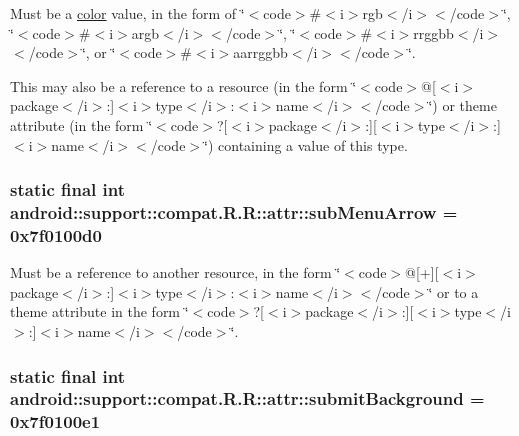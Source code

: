 Must be a \hyperlink{classandroid_1_1support_1_1compat_1_1_r_1_1color}{color} value, in the form of \char`\"{}$<$code$>$\#$<$i$>$rgb$<$/i$>$$<$/code$>$\char`\"{}, \char`\"{}$<$code$>$\#$<$i$>$argb$<$/i$>$$<$/code$>$\char`\"{}, \char`\"{}$<$code$>$\#$<$i$>$rrggbb$<$/i$>$$<$/code$>$\char`\"{}, or \char`\"{}$<$code$>$\#$<$i$>$aarrggbb$<$/i$>$$<$/code$>$\char`\"{}. 

This may also be a reference to a resource (in the form \char`\"{}$<$code$>$@\mbox{[}$<$i$>$package$<$/i$>$:\mbox{]}$<$i$>$type$<$/i$>$:$<$i$>$name$<$/i$>$$<$/code$>$\char`\"{}) or theme attribute (in the form \char`\"{}$<$code$>$?\mbox{[}$<$i$>$package$<$/i$>$:\mbox{]}\mbox{[}$<$i$>$type$<$/i$>$:\mbox{]}$<$i$>$name$<$/i$>$$<$/code$>$\char`\"{}) containing a value of this type. \hypertarget{classandroid_1_1support_1_1compat_1_1_r_1_1attr_ba8eed4cb75c9f5bf93cb1286f7bbc19}{
\subsubsection[{subMenuArrow}]{\setlength{\rightskip}{0pt plus 5cm}static final int android::support::compat.R.R::attr::subMenuArrow = 0x7f0100d0}}
\label{classandroid_1_1support_1_1compat_1_1_r_1_1attr_ba8eed4cb75c9f5bf93cb1286f7bbc19}


Must be a reference to another resource, in the form \char`\"{}$<$code$>$@\mbox{[}+\mbox{]}\mbox{[}$<$i$>$package$<$/i$>$:\mbox{]}$<$i$>$type$<$/i$>$:$<$i$>$name$<$/i$>$$<$/code$>$\char`\"{} or to a theme attribute in the form \char`\"{}$<$code$>$?\mbox{[}$<$i$>$package$<$/i$>$:\mbox{]}\mbox{[}$<$i$>$type$<$/i$>$:\mbox{]}$<$i$>$name$<$/i$>$$<$/code$>$\char`\"{}. \hypertarget{classandroid_1_1support_1_1compat_1_1_r_1_1attr_ae6151a13b743ed763eb89e9f9103ad6}{
\subsubsection[{submitBackground}]{\setlength{\rightskip}{0pt plus 5cm}static final int android::support::compat.R.R::attr::submitBackground = 0x7f0100e1}}
\label{classandroid_1_1support_1_1compat_1_1_r_1_1attr_ae6151a13b743ed763eb89e9f9103ad6}


